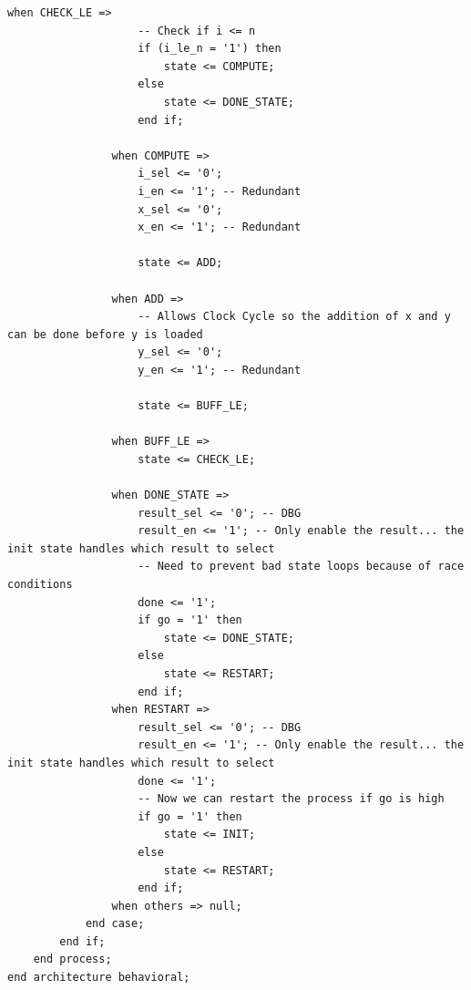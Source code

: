 \documentclass{article}
\begin{document}
\begin{lstlisting}[caption=One Process FSM VHDL Code, label=lst:one-process-fsm-vhdl-code]
                when CHECK_LE =>
                    -- Check if i <= n
                    if (i_le_n = '1') then
                        state <= COMPUTE;
                    else
                        state <= DONE_STATE;
                    end if;
                
                when COMPUTE =>
                    i_sel <= '0';
                    i_en <= '1'; -- Redundant
                    x_sel <= '0';
                    x_en <= '1'; -- Redundant

                    state <= ADD;

                when ADD =>
                    -- Allows Clock Cycle so the addition of x and y can be done before y is loaded
                    y_sel <= '0';
                    y_en <= '1'; -- Redundant

                    state <= BUFF_LE;
                
                when BUFF_LE =>
                    state <= CHECK_LE;

                when DONE_STATE =>
                    result_sel <= '0'; -- DBG 
                    result_en <= '1'; -- Only enable the result... the init state handles which result to select
                    -- Need to prevent bad state loops because of race conditions
                    done <= '1';
                    if go = '1' then
                        state <= DONE_STATE;
                    else
                        state <= RESTART;
                    end if;
                when RESTART =>
                    result_sel <= '0'; -- DBG 
                    result_en <= '1'; -- Only enable the result... the init state handles which result to select
                    done <= '1';
                    -- Now we can restart the process if go is high
                    if go = '1' then
                        state <= INIT;
                    else
                        state <= RESTART;
                    end if;
                when others => null;
            end case;
        end if;
    end process;
end architecture behavioral;
\end{lstlisting}
\end{document}
